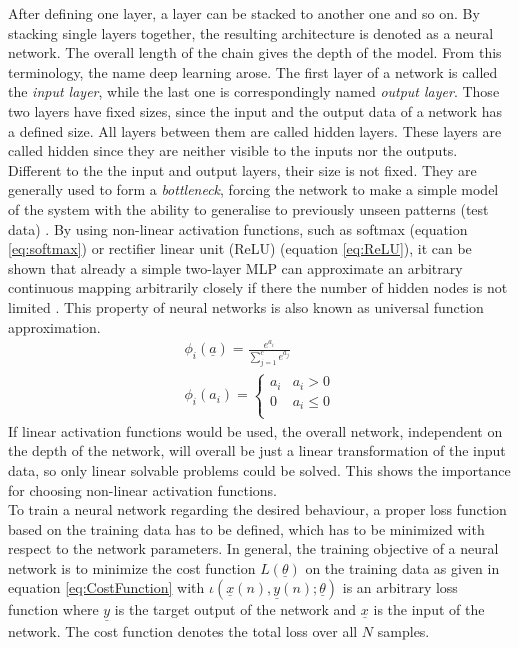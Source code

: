 \documentclass[12pt,DIV14,BCOR12mm,a4paper,footexclude,headinclude,halfparskip-,twoside,openright,cleardoubleempty,idxtotoc,bibtotoc,listtotoc,abstracton]{scrreprt} %
\numberwithin{equation}{chapter}
\begin{document}
After defining one layer, a layer can be stacked to another one and so on. By stacking single layers together, the resulting architecture is denoted as a neural network. The overall length of the chain gives the depth of the model. From this terminology, the name deep learning arose. The first layer of a network is called the \textit{input layer}, while the last one is correspondingly named \textit{output layer}. Those two layers have fixed sizes, since the input and the output data of a network has a defined size. All layers between them are called hidden layers. These layers are called hidden since they are neither visible to the inputs nor the outputs. Different to the the input and output layers, their size is not fixed. They are generally used to form a \textit{bottleneck}, forcing the network to make a simple model of the system with the ability to generalise to previously unseen patterns (test data) \cite{Michie-et-al-1994}. By using non-linear activation functions, such as softmax (equation \ref{eq:softmax}) or rectifier linear unit (ReLU) (equation \ref{eq:ReLU}), it can be shown that already a simple two-layer MLP can approximate an arbitrary continuous mapping arbitrarily closely if there the number of hidden nodes is not limited \cite{Michie-et-al-1994}. This property of neural networks is also known as universal function approximation.
\begin{align}
	\phi_{i}(\underline{a}) = \frac{e^{a_{i}}}{\sum_{j=1}^{c}e^{a_{j}}} \label{eq:softmax}\\
	\phi_{i}(a_{i}) = \begin{cases} a_i & a_{i} > 0\\0 & a_{i} \leq 0\\ \end{cases} \label{eq:ReLU}
\end{align}
If linear activation functions would be used, the overall network, independent on the depth of the network, will overall be just a linear transformation of the input data, so only linear solvable problems could be solved. This shows the importance for choosing non-linear activation functions.\\
To train a neural network regarding the desired behaviour, a proper loss function based on the training data has to be defined, which has to be minimized with respect to the network parameters. 
In general, the training objective of a neural network is to minimize the cost function $L(\underline{\theta})$ on the training data as given in equation \ref{eq:CostFunction} with $\iota(\underline{x}(n),\underline{y}(n);\underline{\theta})$ is an arbitrary loss function where $\underline{y}$ is the target output of the network and $\underline{x}$ is the input of the network. The cost function denotes the total loss over all $N$ samples.
\end{document}
